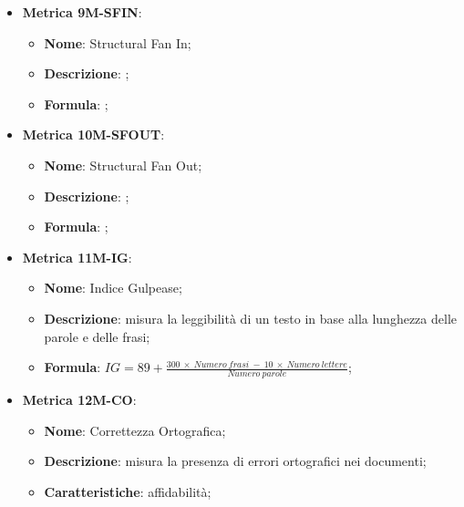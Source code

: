 \begin{itemize}
    \item \textbf{Metrica 9M-SFIN}:
    \begin{itemize}
        \item \textbf{Nome}: Structural Fan In;
        \item \textbf{Descrizione}: ;
        \item \textbf{Formula}: ;
    \end{itemize}
\end{itemize}

\begin{itemize}
    \item \textbf{Metrica 10M-SFOUT}:
    \begin{itemize}
        \item \textbf{Nome}: Structural Fan Out;
        \item \textbf{Descrizione}: ;
        \item \textbf{Formula}: ;
    \end{itemize}
\end{itemize}

\begin{itemize}
    \item \textbf{Metrica 11M-IG}:
    \begin{itemize}
        \item \textbf{Nome}: Indice Gulpease;
        \item \textbf{Descrizione}: misura la leggibilità di un testo in base alla lunghezza delle parole e delle frasi;
        \item \textbf{Formula}: $IG = 89 + \frac{300 \:\times \:Numero\:frasi \:- \:10 \:\times\: Numero\:lettere}{Numero\:parole}$;
    \end{itemize}
\end{itemize}

\begin{itemize}
    \item \textbf{Metrica 12M-CO}:
    \begin{itemize}
        \item \textbf{Nome}: Correttezza Ortografica;
        \item \textbf{Descrizione}: misura la presenza di errori ortografici nei documenti;
        \item \textbf{Caratteristiche}: affidabilità;
    \end{itemize}
\end{itemize}

